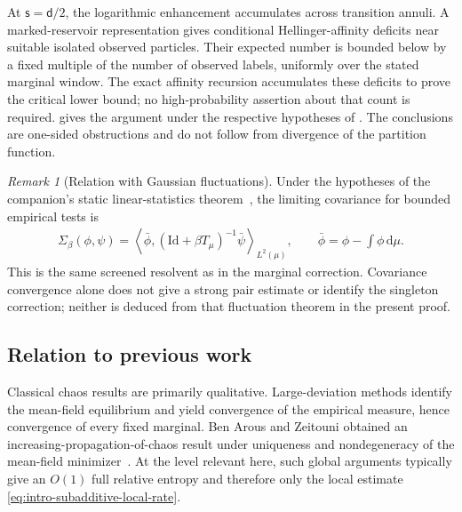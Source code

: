 \documentclass[11pt,reqno]{amsart}
\numberwithin{equation}{section}
\theoremstyle{plain}
\theoremstyle{remark}
\newtheorem{remark}[remark]{Remark}
\renewcommand{\d}{\mathsf{d}}
\newcommand{\md}{\mathrm{d}}
\newcommand{\be}{\beta}
\newcommand{\s}{\mathsf{s}}
\begin{document}
At $\s=\d/2$, the logarithmic enhancement accumulates across transition annuli.  A marked-reservoir representation gives conditional Hellinger-affinity deficits near suitable isolated observed particles.  Their expected number is bounded below by a fixed multiple of the number of observed labels, uniformly over the stated marginal window.  The exact affinity recursion accumulates these deficits to prove the critical lower bound; no high-probability assertion about that count is required.   gives the argument under the respective hypotheses of .  The conclusions are one-sided obstructions and do not follow from divergence of the partition function.

\begin{remark}[Relation with Gaussian fluctuations]\label{rem:intro-gaussian-fluctuations}
Under the hypotheses of the companion's static linear-statistics theorem~\cite[Proposition~2.11]{DGR26}, the limiting covariance for bounded empirical tests is
\begin{align}\label{eq:intro-gaussian-fluctuation-covariance}
 \Sigma_\be(\phi,\psi)
 =\left\langle\bar\phi,(\mathrm{Id}+\be T_\mu)^{-1}\bar\psi\right\rangle_{L^2(\mu)},
 \qquad \bar\phi=\phi-\int\phi\,\md\mu.
\end{align}
This is the same screened resolvent as in the marginal correction.  Covariance convergence alone does not give a strong pair estimate or identify the singleton correction; neither is deduced from that fluctuation theorem in the present proof.
\end{remark}

\subsection{Relation to previous work}
\label{subsec:related-work}

Classical chaos results are primarily qualitative.  Large-deviation methods identify the mean-field equilibrium and yield convergence of the empirical measure, hence convergence of every fixed marginal.  Ben Arous and Zeitouni obtained an increasing-propagation-of-chaos result under uniqueness and nondegeneracy of the mean-field minimizer~\cite{BenArousZeitouni1999}.  At the level relevant here, such global arguments typically give an \(O(1)\) full relative entropy and therefore only the local estimate \eqref{eq:intro-subadditive-local-rate}.
\end{document}
